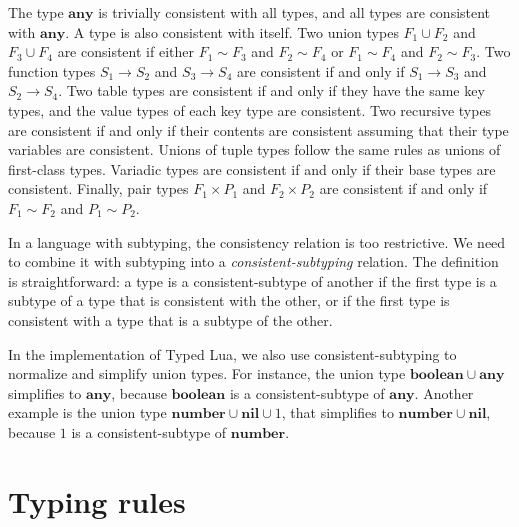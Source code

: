 \documentclass[preprint]{sigplanconf}
\newcommand{\Any}{\mathbf{any}}
\newcommand{\Nil}{\mathbf{nil}}
\newcommand{\Boolean}{\mathbf{boolean}}
\newcommand{\Number}{\mathbf{number}}
\begin{document}
The type $\Any$ is trivially consistent with all types, and all types
are consistent with $\Any$. A type is also consistent with
itself. Two union types $F_1 \cup F_2$ and $F_3 \cup F_4$ are
consistent if either $F_1 \sim F_3$ and $F_2 \sim F_4$ or
$F_1 \sim F_4$ and $F_2 \sim F_3$. Two function types
$S_1 \rightarrow S_2$ and $S_3 \rightarrow S_4$ are consistent
if and only if $S_1 \rightarrow S_3$ and $S_2 \rightarrow S_4$. Two table types are consistent if and only if they have the same key types, and the value types of each key type are consistent. Two recursive types are consistent if and only if their contents are consistent assuming that their type variables are consistent. Unions of tuple types follow the same rules as unions of first-class types. Variadic types are consistent if and only if their base types are consistent. 
Finally, pair types $F_1 \times P_1$ and $F_2 \times P_2$ are
consistent if and only if $F_1 \sim F_2$ and $P_1 \sim P_2$.

In a language with subtyping, the consistency relation is
too restrictive. We need to combine it with subtyping into a
{\em consistent-subtyping} relation. The definition is
straightforward: a type is a consistent-subtype
of another if the first type is a subtype of a type
that is consistent with the other, or if the first type
is consistent with a type that is a subtype of the other.

In the implementation of Typed Lua, we also use consistent-subtyping to normalize and simplify union types.
For instance, the union type $\Boolean \cup \Any$ simplifies
to $\Any$, because $\Boolean$ is a consistent-subtype
of $\Any$. Another example is the union type
$\Number \cup \Nil \cup 1$, that simplifies to
$\Number \cup \Nil$, because $1$ is a consistent-subtype of $\Number$.

\section{Typing rules}
\label{sec:rules}
\end{document}
